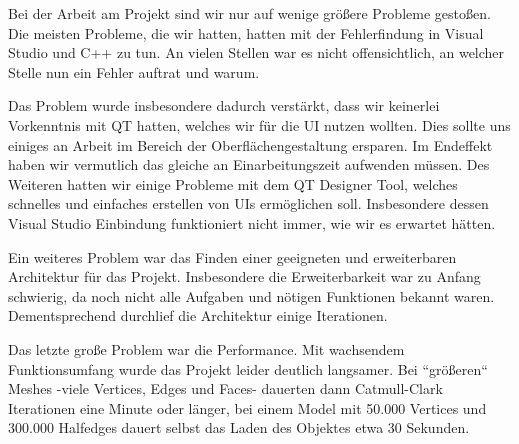
Bei der Arbeit am Projekt sind wir nur auf wenige grö\ss{}ere Probleme gesto\ss{}en. 
Die meisten Probleme, die wir hatten, hatten mit der Fehlerfindung in Visual Studio und C++ zu tun. 
An vielen Stellen war es nicht offensichtlich, an welcher Stelle nun ein Fehler auftrat und warum. 

Das Problem wurde insbesondere dadurch verstärkt, dass wir keinerlei Vorkenntnis mit QT hatten, welches wir für die UI nutzen wollten. 
Dies sollte uns einiges an Arbeit im Bereich der Oberflächengestaltung ersparen.
Im Endeffekt haben wir vermutlich das gleiche an Einarbeitungszeit aufwenden müssen. 
Des Weiteren hatten wir einige Probleme mit dem QT Designer Tool, welches schnelles und einfaches erstellen von UIs ermöglichen soll. 
Insbesondere dessen Visual Studio Einbindung funktioniert nicht immer, wie wir es erwartet hätten. 

Ein weiteres Problem war das Finden einer geeigneten und erweiterbaren Architektur für das Projekt. 
Insbesondere die Erweiterbarkeit war zu Anfang schwierig, da noch nicht alle Aufgaben und nötigen Funktionen bekannt waren.
Dementsprechend durchlief die Architektur einige Iterationen.

Das letzte gro\ss{}e Problem war die Performance. 
Mit wachsendem Funktionsumfang wurde das Projekt leider deutlich langsamer. 
Bei ``grö\ss{}eren`` Meshes -viele Vertices, Edges und Faces- dauerten dann Catmull-Clark Iterationen eine Minute oder länger, bei einem Model mit 50.000 Vertices und 300.000 Halfedges dauert selbst das Laden des Objektes etwa 30 Sekunden.
